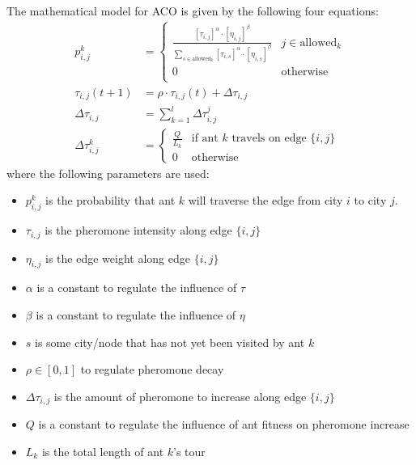 \documentclass[11pt]{report}
\begin{document}
            The mathematical model for ACO is given by the following four equations:
            {\Large
            \begin{align}
                p_{i, j}^{k} &= \left\{
                \begin{array}{ll}
                    \frac{\left[ \tau_{i,j} \right]^{\alpha} \cdot \left[ \eta_{i, j} \right]^{\beta}}
                    {\sum_{s\in\text{allowed}_{k}}\left[\tau_{i, s}\right]^{\alpha} \cdot \left[\eta_{i, s}\right]^{\beta}} & j\in \text{allowed}_{k}\\
                    0 & \text{otherwise} \\
                \end{array} 
                \right. \\
                \tau_{i, j}\left(t+1\right) &= \rho \cdot \tau_{i, j}\left(t\right) + \Delta\tau_{i, j}\\
                \Delta\tau_{i, j} &= \sum_{k=1}^{l}\Delta\tau_{i, j}^{j}\\
                \Delta\tau_{i, j}^{k} &= \left\{
                    \begin{array}{ll}
                        \frac{Q}{L_k} & \text{if ant $k$ travels on edge $\{i, j\}$} \\
                        0 & \text{otherwise}
                    \end{array}
                \right.
            \end{align}
            }
            where the following parameters are used: 
            \begin{itemize}
                \item $p_{i,j}^k$ is the probability that ant $k$ will traverse the edge from city $i$ to city $j$.
                \item $\tau_{i, j}$ is the pheromone intensity along edge $\{i, j\}$
                \item $\eta_{i, j}$ is the edge weight along edge $\{i, j\}$
                \item $\alpha$ is a constant to regulate the influence of $\tau$
                \item $\beta$ is a constant to regulate the influence of $\eta$
                \item $s$ is some city/node that has not yet been visited by ant $k$
                \item $\rho \in \left[0, 1\right]$ to regulate pheromone decay
                \item $\Delta\tau_{i,j}$ is the amount of pheromone to increase along edge $\{i, j\}$
                \item $Q$ is a constant to regulate the influence of ant fitness on pheromone increase
                \item $L_k$ is the total length of ant $k$'s tour
            \end{itemize}
\end{document}
